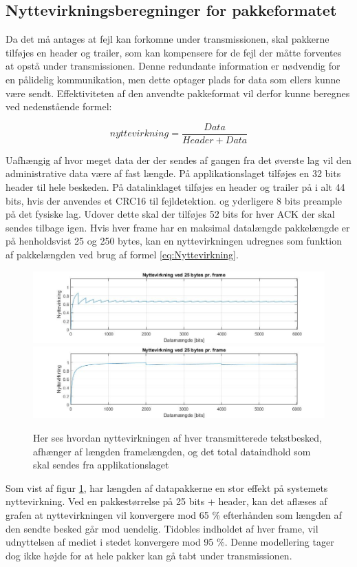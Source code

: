 \subsection{Nyttevirkningsberegninger for pakkeformatet}
Da det må antages at fejl kan forkomne under transmissionen, skal pakkerne tilføjes en header og trailer, som kan kompensere for de fejl der måtte forventes at opstå under transmissionen. Denne redundante information er nødvendig for en pålidelig kommunikation, men dette optager plads for data som ellers kunne være sendt. Effektiviteten af den anvendte pakkeformat vil derfor kunne beregnes ved nedenstående formel: 

\begin{equation}
nyttevirkning = \frac{Data}{Header + Data}
\label{eq:Nyttevirkning}
\end{equation}

Uafhængig af hvor meget data der der sendes af gangen fra det øverste lag vil den administrative data være af fast længde. På applikationslaget tilføjes en 32 bits header til hele beskeden. På datalinklaget tilføjes en header og trailer på i alt 44 bits, hvis der anvendes et CRC16 til fejldetektion. og yderligere 8 bits preample på det fysiske lag. Udover dette skal der tilføjes 52 bits for hver ACK der skal sendes tilbage igen. Hvis hver frame har en maksimal datalængde pakkelængde er på henholdsvist 25 og 250 bytes, kan en nyttevirkningen udregnes som funktion af pakkelængden ved brug af formel \eqref{eq:Nyttevirkning}.  

\begin{figure}[h!]
\centering
\includegraphics[scale=0.5]{Billeder/Nyttevirkning25.jpg} 
\includegraphics[scale=0.5]{Billeder/Nyttevirkning250.jpg}
\caption{ Her ses hvordan nyttevirkningen af hver transmitterede tekstbesked, afhænger af længden framelængden, og det total dataindhold som skal sendes fra applikationslaget}
\label{fig:Nyttevirkningved25}
\end{figure}

Som vist af figur \ref{fig:Nyttevirkningved25}, har længden af datapakkerne en stor effekt på systemets nyttevirkning. Ved en pakkestørrelse på 25 bits + header, kan det aflæses af grafen at nyttevirkningen vil konvergere mod 65 \% efterhånden som længden af den sendte besked går mod uendelig. Tidobles indholdet af hver frame, vil udnyttelsen af mediet i stedet konvergere mod 95 \%. Denne modellering tager dog ikke højde for at hele pakker kan gå tabt under transmissionen. 